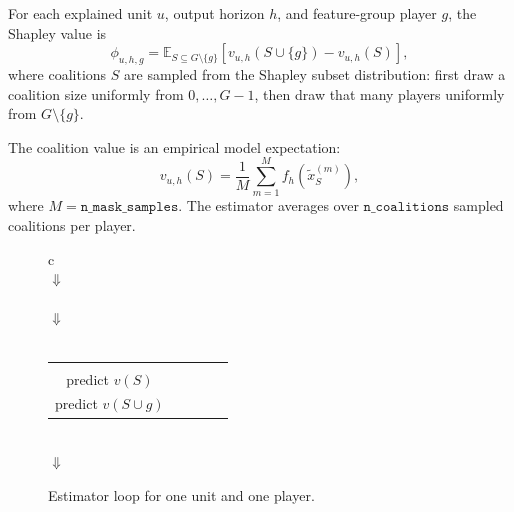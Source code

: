 \documentclass[11pt]{article}
\newcommand{\code}[1]{\texttt{#1}}
\begin{document}
For each explained unit \(u\), output horizon \(h\), and feature-group player
\(g\), the Shapley value is
\[
\phi_{u,h,g}
=
\mathbb{E}_{S \subseteq G \setminus \{g\}}
\left[
v_{u,h}(S \cup \{g\}) - v_{u,h}(S)
\right],
\]
where coalitions \(S\) are sampled from the Shapley subset distribution: first
draw a coalition size uniformly from \(0,\dots,G-1\), then draw that many
players uniformly from \(G \setminus \{g\}\).

The coalition value is an empirical model expectation:
\[
v_{u,h}(S)
=
\frac{1}{M}
\sum_{m=1}^{M}
f_h\!\left(\tilde{x}^{(m)}_S\right),
\]
where \(M=\code{n\_mask\_samples}\).  The estimator averages over
\(\code{n\_coalitions}\) sampled coalitions per player.

\begin{figure}[h]
\centering
\begin{tabular}{c}
\\[2mm]\(\Downarrow\)\\[2mm]
\\[2mm]\(\Downarrow\)\\[2mm]
\\[3mm]
\begin{tabular}{ccc}
\fbox{\begin{minipage}{0.28\linewidth}\centering Mask \(S\)\\predict \(v(S)\)\end{minipage}}
& \(\qquad\) &
\fbox{\begin{minipage}{0.28\linewidth}\centering Mask \(S\cup\{g\}\)\\predict \(v(S\cup g)\)\end{minipage}}
\end{tabular}
\\[3mm]\(\Downarrow\)\\[2mm]
\end{tabular}
\caption{Estimator loop for one unit and one player.}
\end{figure}
\end{document}
